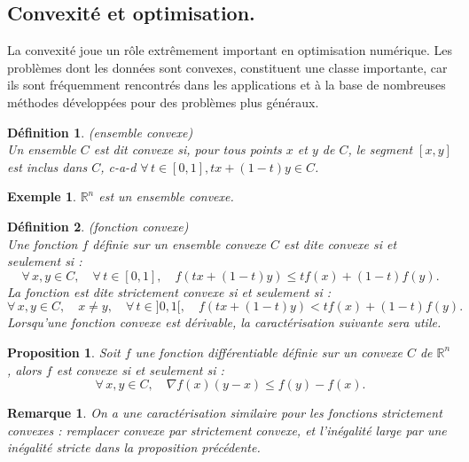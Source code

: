 \documentclass[12pt,a4paper,openay]{book}
\newtheorem{Def}{D\'efinition}[chapter]
\numberwithin{equation}{chapter}
\newtheorem{ex}{Exemple}[chapter]
\newtheorem{rmq}{Remarque}[chapter]
\newtheorem{prop}{Proposition}[chapter]
\newcommand{\R}{\mathbb{R}}
\let\oldforall\forall
\renewcommand{\forall}{\oldforall\,}
\begin{document}
	\subsection{Convexit\'e et optimisation.}
	La convexit\'e joue un rôle extr\^emement important en optimisation num\'erique. Les probl\`emes dont les donn\'ees sont convexes, constituent une classe importante, car ils sont fr\'equemment rencontr\'es dans les applications et \`a la base de nombreuses m\'ethodes d\'evelopp\'ees pour des probl\`emes plus g\'en\'eraux.
	\begin{Def}
	(ensemble convexe)\\
		Un ensemble $C$ est dit convexe si, pour tous  points $x$ et $y$ de $C$, le segment $[x, y]$ est inclus dans $C$, c-a-d $\forall t \in[0,1], t x+(1-t) y\in C$.
	\end{Def}	
	\begin{ex}
	$\R^n$ est un ensemble convexe.
	\end{ex}
	\begin{Def}
	(fonction convexe)\\
		Une fonction $f$ d\'efinie sur un ensemble convexe $C$ est dite convexe si et seulement si :
		$$
		\forall x, y \in C, \quad \forall t \in[0,1], \quad f(t x+(1-t) y) \leq t f(x)+(1-t) f(y) .
		$$	
		La fonction est dite strictement convexe si et seulement si :
		$$
		\forall x, y \in C, \quad x \neq y, \quad \forall t \in] 0,1[, \quad f(t x+(1-t) y)<t f(x)+(1-t) f(y) .
		$$	
		Lorsqu'une fonction convexe est d\'erivable, la caract\'erisation suivante sera utile.
	\end{Def}
	
	\begin{prop}
	Soit $f$ une fonction diff\'erentiable d\'efinie sur un convexe $C$ de $\R^n$, alors $f$ est convexe si et seulement si :
		$$
		\forall x, y \in C, \quad \nabla f(x)(y-x) \leq f(y)-f(x) .
		$$
	\end{prop}
	
	\begin{rmq}
		On a une caract\'erisation similaire pour les fonctions strictement convexes : remplacer convexe par strictement convexe, et l'in\'egalit\'e large par une in\'egalit\'e stricte dans la proposition pr\'ec\'edente.
	\end{rmq}
	
\end{document}
